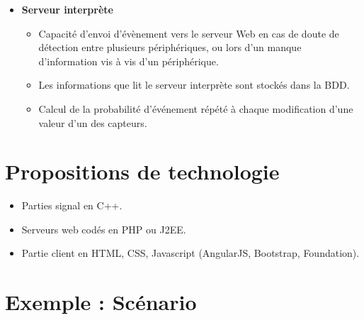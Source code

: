 \documentclass[10pt,a4paper]{article}
\begin{document}
\begin{itemize}
\item \textbf{Serveur interprète}
\begin{itemize}
  \item Capacité d'envoi d'évènement vers le serveur Web en cas de doute de détection entre plusieurs périphériques, ou lors d'un manque d'information vis à vis d'un périphérique.
  \item Les informations que lit le serveur interprète sont stockés dans la BDD.
  \item Calcul de la probabilité d'événement répété à chaque modification d'une valeur d'un des capteurs.
\end{itemize}
\end{itemize}

\section{Propositions de technologie}
\begin{itemize}
\item Parties signal en C++.
\item Serveurs web codés en PHP ou J2EE.
\item Partie client en HTML, CSS, Javascript (AngularJS, Bootstrap, Foundation).
\end{itemize}

\newpage
\section{Exemple : Scénario}
\end{document}
